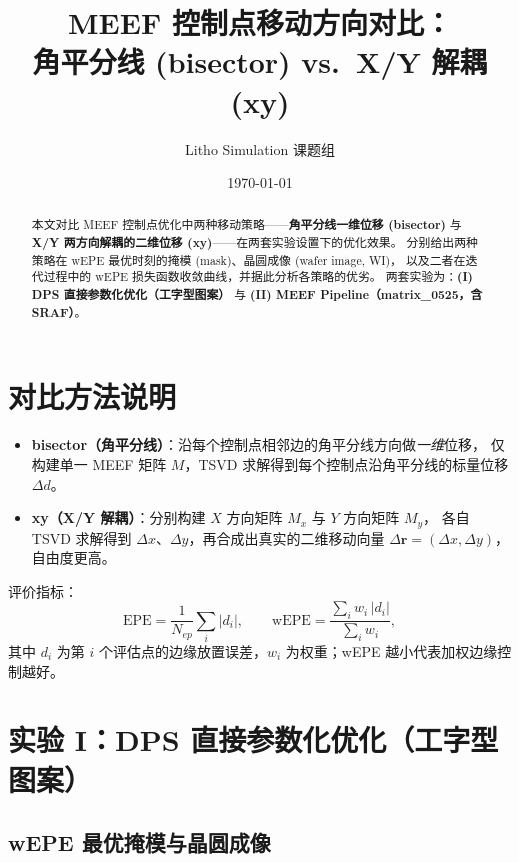 \documentclass[11pt]{article}
\title{\textbf{MEEF 控制点移动方向对比：\\ 角平分线 (bisector) vs.\ X/Y 解耦 (xy)}}
\author{Litho Simulation 课题组}
\date{\today}
\begin{document}
\maketitle

\begin{abstract}
本文对比 MEEF 控制点优化中两种移动策略——\textbf{角平分线一维位移 (bisector)} 与
\textbf{X/Y 两方向解耦的二维位移 (xy)}——在两套实验设置下的优化效果。
分别给出两种策略在 wEPE 最优时刻的掩模 (mask)、晶圆成像 (wafer image, WI)，
以及二者在迭代过程中的 wEPE 损失函数收敛曲线，并据此分析各策略的优劣。
两套实验为：\textbf{(I) DPS 直接参数化优化（工字型图案）} 与
\textbf{(II) MEEF Pipeline（matrix\_0525，含 SRAF）}。
\end{abstract}

\section{对比方法说明}
\begin{itemize}
  \item \textbf{bisector（角平分线）}：沿每个控制点相邻边的角平分线方向做\emph{一维}位移，
        仅构建单一 MEEF 矩阵 $M$，TSVD 求解得到每个控制点沿角平分线的标量位移 $\Delta d$。
  \item \textbf{xy（X/Y 解耦）}：分别构建 $X$ 方向矩阵 $M_x$ 与 $Y$ 方向矩阵 $M_y$，
        各自 TSVD 求解得到 $\Delta x$、$\Delta y$，再合成出真实的二维移动向量
        $\Delta \mathbf{r}=(\Delta x,\Delta y)$，自由度更高。
\end{itemize}

评价指标：
\[
  \text{EPE} = \frac{1}{N_{ep}}\sum_i |d_i|,\qquad
  \text{wEPE} = \frac{\sum_i w_i\,|d_i|}{\sum_i w_i},
\]
其中 $d_i$ 为第 $i$ 个评估点的边缘放置误差，$w_i$ 为权重；wEPE 越小代表加权边缘控制越好。

\section{实验 I：DPS 直接参数化优化（工字型图案）}

\subsection{wEPE 最优掩模与晶圆成像}
\end{document}
